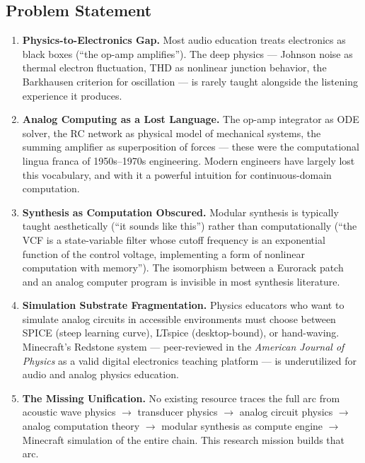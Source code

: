 \documentclass[11pt,letterpaper]{article}
\begin{document}
\subsection{Problem Statement}

\begin{enumerate}[leftmargin=2em]
  \item \textbf{Physics-to-Electronics Gap.} Most audio education treats electronics as black boxes (``the op-amp amplifies''). The deep physics --- Johnson noise as thermal electron fluctuation, THD as nonlinear junction behavior, the Barkhausen criterion for oscillation --- is rarely taught alongside the listening experience it produces.

  \item \textbf{Analog Computing as a Lost Language.} The op-amp integrator as ODE solver, the RC network as physical model of mechanical systems, the summing amplifier as superposition of forces --- these were the computational lingua franca of 1950s--1970s engineering. Modern engineers have largely lost this vocabulary, and with it a powerful intuition for continuous-domain computation.

  \item \textbf{Synthesis as Computation Obscured.} Modular synthesis is typically taught aesthetically (``it sounds like this'') rather than computationally (``the VCF is a state-variable filter whose cutoff frequency is an exponential function of the control voltage, implementing a form of nonlinear computation with memory''). The isomorphism between a Eurorack patch and an analog computer program is invisible in most synthesis literature.

  \item \textbf{Simulation Substrate Fragmentation.} Physics educators who want to simulate analog circuits in accessible environments must choose between SPICE (steep learning curve), LTspice (desktop-bound), or hand-waving. Minecraft's Redstone system --- peer-reviewed in the \textit{American Journal of Physics} as a valid digital electronics teaching platform --- is underutilized for audio and analog physics education.

  \item \textbf{The Missing Unification.} No existing resource traces the full arc from acoustic wave physics $\rightarrow$ transducer physics $\rightarrow$ analog circuit physics $\rightarrow$ analog computation theory $\rightarrow$ modular synthesis as compute engine $\rightarrow$ Minecraft simulation of the entire chain. This research mission builds that arc.
\end{enumerate}
\end{document}
